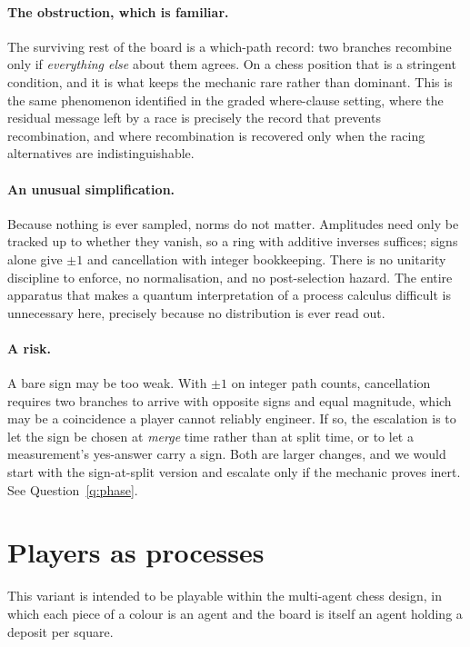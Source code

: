 \documentclass[11pt,a4paper]{article}
\theoremstyle{definition}
\theoremstyle{plain}
\begin{document}
\paragraph{The obstruction, which is familiar.}
The surviving rest of the board is a which-path record: two branches recombine
only if \emph{everything else} about them agrees. On a chess position that is a
stringent condition, and it is what keeps the mechanic rare rather than
dominant. This is the same phenomenon identified in the graded where-clause
setting, where the residual message left by a race is precisely the record that
prevents recombination, and where recombination is recovered only when the
racing alternatives are indistinguishable.

\paragraph{An unusual simplification.}
Because nothing is ever sampled, norms do not matter. Amplitudes need only be
tracked up to whether they vanish, so a ring with additive inverses suffices;
signs alone give $\pm 1$ and cancellation with integer bookkeeping. There is no
unitarity discipline to enforce, no normalisation, and no post-selection
hazard. The entire apparatus that makes a quantum interpretation of a process
calculus difficult is unnecessary here, precisely because no distribution is
ever read out.

\paragraph{A risk.}
A bare sign may be too weak. With $\pm 1$ on integer path counts, cancellation
requires two branches to arrive with opposite signs and equal magnitude, which
may be a coincidence a player cannot reliably engineer. If so, the escalation
is to let the sign be chosen at \emph{merge} time rather than at split time, or
to let a measurement's yes-answer carry a sign. Both are larger changes, and we
would start with the sign-at-split version and escalate only if the mechanic
proves inert. See Question~\ref{q:phase}.

\section{Players as processes}
\label{sec:f1r3lang}

This variant is intended to be playable within the multi-agent chess design, in
which each piece of a colour is an agent and the board is itself an agent
holding a deposit per square.
\end{document}
